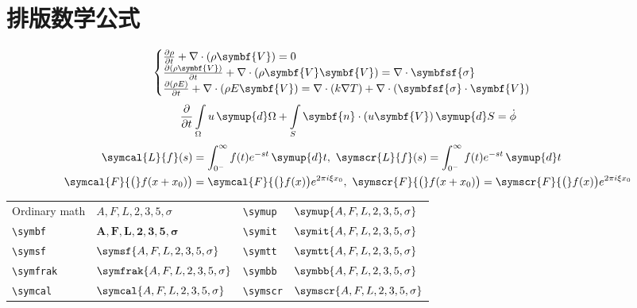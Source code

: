 \documentclass[doctor]{shtthesis}
\begin{document}
\section{排版数学公式}
\providecommand{\Vector}[1]{\ensuremath{\symbf{ #1 }}}
\providecommand{\Tensor}[1]{\ensuremath{\symbfsf{ #1 }}}
\begin{equation}
  \begin{cases}
      \frac{\partial \rho}{\partial t} + \nabla\cdot(\rho\Vector{V}) = 0 \\
      \frac{\partial (\rho\Vector{V})}{\partial t} + \nabla\cdot(\rho\Vector{V}\Vector{V}) = \nabla\cdot\Tensor{\sigma} \\
      \frac{\partial (\rho E)}{\partial t} + \nabla\cdot(\rho E\Vector{V}) = \nabla\cdot(k\nabla T) + \nabla\cdot(\Tensor{\sigma}\cdot\Vector{V})
  \end{cases}
\end{equation}
\begin{equation}
  \frac{\partial }{\partial t}\int\limits_{\Omega} u \, \symup{d}\Omega + \int\limits_{S} \Vector{n}\cdot(u\Vector{V}) \, \symup{d}S = \dot{\phi}
\end{equation}
\begin{equation*}
  \begin{split}
      \symcal{L} \{f\}(s) &= \int _{0^{-}}^{\infty} f(t) e^{-st} \, \symup{d}t, \ 
      \symscr{L} \{f\}(s) = \int _{0^{-}}^{\infty} f(t) e^{-st} \, \symup{d}t\\
      \symcal{F} {\bigl (} f(x+x_{0}) {\bigr )} &= \symcal{F} {\bigl (} f(x) {\bigr )} e^{2\pi i\xi x_{0}}, \ 
      \symscr{F} {\bigl (} f(x+x_{0}) {\bigr )} = \symscr{F} {\bigl (} f(x) {\bigr )} e^{2\pi i\xi x_{0}}
  \end{split}
\end{equation*}

\begin{center}
\begin{tabular}{*{4}{l}}
  \toprule
  Ordinary math& $A,F,L,2,3,5,\sigma$& \verb|\symup|& $\symup{A,F,L,2,3,5,\sigma}$ \\
  \verb|\symbf|& $\symbf{A,F,L,2,3,5,\sigma}$& \verb|\symit|& $\symit{A,F,L,2,3,5,\sigma}$ \\
  \verb|\symsf|& $\symsf{A,F,L,2,3,5,\sigma}$& \verb|\symtt|& $\symtt{A,F,L,2,3,5,\sigma}$ \\
  \verb|\symfrak|& $\symfrak{A,F,L,2,3,5,\sigma}$& \verb|\symbb|& $\symbb{A,F,L,2,3,5,\sigma}$ \\
  \verb|\symcal|& $\symcal{A,F,L,2,3,5,\sigma}$& \verb|\symscr|& $\symscr{A,F,L,2,3,5,\sigma}$ \\
  \bottomrule
\end{tabular}
\end{center}
\end{document}
